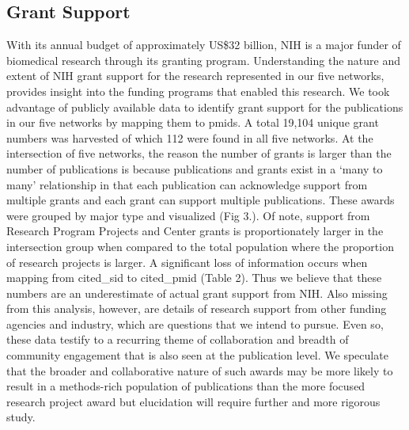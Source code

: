 \documentclass[10pt,letterpaper]{article}
\begin{document}
\subsection*{Grant Support} With its annual budget of approximately US\$32 billion, NIH is a major funder of biomedical research through its granting program. Understanding the nature and extent of NIH grant support for the research represented in our five networks, provides insight into the funding programs that enabled this research. We took advantage of publicly available data\cite{bibNIHExPORTER} to identify grant support for the publications in our five networks by mapping them to pmids. A total 19,104 unique grant numbers was harvested of which 112 were found in all five networks. At the intersection of five networks, the reason the number of grants is larger than the number of publications is because publications and grants exist in a `many to many' relationship in that each publication can acknowledge support from multiple grants and each grant can support multiple publications. These awards were grouped by major type  and visualized (Fig 3.). Of note, support from Research Program Projects and Center grants is proportionately larger in the intersection group when compared to the total population where the proportion of research projects is larger. A significant loss of information occurs when mapping from cited\_sid to cited\_pmid (Table 2). Thus we believe that these numbers are an underestimate of actual grant support from NIH. Also missing from this analysis, however, are details of research support from other funding agencies and industry, which are questions that we intend to pursue. Even so, these data testify to a recurring theme of collaboration and breadth of community engagement that is also seen at the publication level. We speculate that the broader and collaborative nature of such awards may be more likely to result in a methods-rich population of publications than the more focused research project award but elucidation will require further and more rigorous study. 
\end{document}
